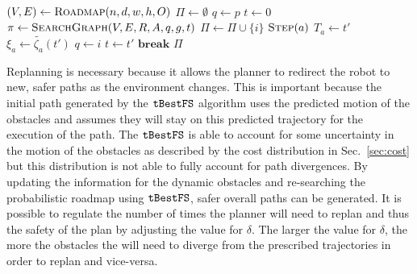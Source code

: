 \begin{algorithm}[ht]
    \caption{$\Function{Dodger}(n, d, w, h, \delta, p, g, O, A, R)$}
    \\\algorithmicensure{}
    \label{algo:path}
    \begin{algorithmic}[1]
        \setcounter{ALC@line}{0}
        \STATE $(V, E) \leftarrow \Function{Roadmap}(n, d, w, h, O)$
        \STATE $\Pi \leftarrow \emptyset$
        \STATE $q \leftarrow p$
        \STATE $t \leftarrow 0$
            \STATE $\pi \leftarrow \Function{SearchGraph}(V, E, R, A, q, g, t)$
                \STATE $\Pi \leftarrow \Pi \cup \{i\}$
                    \STATE $\Function{Step}(a)$
                \ENDFOR
                        \STATE $T_a \leftarrow t'$
                        \STATE $\xi_a \leftarrow \tilde{\zeta_a}(t')$
                    \ENDFOR
                    \STATE $q \leftarrow i$
                    \STATE $t \leftarrow t'$
                    \STATE $\textbf{break}$
                \ENDIF
            \ENDFOR
        \ENDWHILE
        \RETURN $\Pi$
    \end{algorithmic}
\end{algorithm}

Replanning is necessary because it allows the planner to redirect the robot to
new, safer paths as the environment changes. This is important because the
initial path generated by the $\Acronym{tBestFS}$ algorithm uses the predicted
motion of the obstacles and assumes they will stay on this predicted trajectory
for the execution of the path. The $\Acronym{tBestFS}$ is able to account for
some uncertainty in the motion of the obstacles as described by the cost
distribution in Sec.~\ref{sec:cost} but this distribution is not able to fully
account for path divergences. By updating the information for the dynamic
obstacles and re-searching the probabilistic roadmap using $\Acronym{tBestFS}$,
safer overall paths can be generated. It is possible to regulate the number of
times the planner will need to replan and thus the safety of the plan by
adjusting the value for $\delta$. The larger the value for $\delta$, the more
the obstacles the will need to diverge from the prescribed trajectories in
order to replan and vice-versa.

